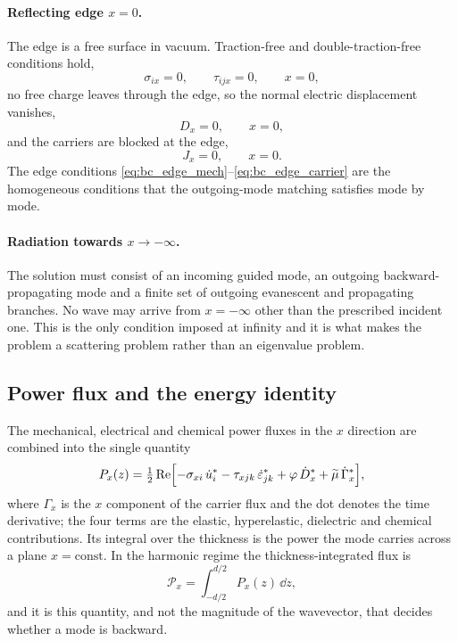 \paragraph{Reflecting edge $x=0$.}
The edge is a free surface in vacuum.  Traction-free and double-traction-free
conditions hold,
\begin{equation}
\label{eq:bc_edge_mech}
\sigma_{ix}=0,\qquad \tau_{ijx}=0,\qquad x=0,
\end{equation}
no free charge leaves through the edge, so the normal electric displacement
vanishes,
\begin{equation}
\label{eq:bc_edge_elec}
D_x=0,\qquad x=0,
\end{equation}
and the carriers are blocked at the edge,
\begin{equation}
\label{eq:bc_edge_carrier}
J_x=0,\qquad x=0 .
\end{equation}
The edge conditions \eqref{eq:bc_edge_mech}--\eqref{eq:bc_edge_carrier} are the
homogeneous conditions that the outgoing-mode matching satisfies mode by mode.

\paragraph{Radiation towards $x\to-\infty$.}
The solution must consist of an incoming guided mode, an outgoing
backward-propagating mode and a finite set of outgoing evanescent and
propagating branches.  No wave may arrive from $x=-\infty$ other than the
prescribed incident one.  This is the only condition imposed at infinity and it
is what makes the problem a scattering problem rather than an eigenvalue
problem.

\subsection{Power flux and the energy identity}
\label{sec:governing_energy}

The mechanical, electrical and chemical power fluxes in the $x$ direction are
combined into the single quantity
\begin{equation}
\label{eq:powerflux}
P_x(z)=\tfrac12\operatorname{Re}\Bigl[-\sigma_{xi}\,\dot u_i^{*}
-\tau_{xjk}\,\dot\varepsilon_{jk}^{*}
+\varphi\,\dot D_x^{*}
+\widetilde\mu\,\dot\Gamma_x^{*}\Bigr],
\end{equation}
where $\Gamma_x$ is the $x$ component of the carrier flux and the dot denotes
the time derivative; the four terms are the elastic, hyperelastic, dielectric
and chemical contributions.  Its integral over the thickness is the power the
mode carries across a plane $x=\text{const}$.  In the harmonic regime the
thickness-integrated flux is
\begin{equation}
\label{eq:Px_int}
\mathcal{P}_x=\int_{-d/2}^{d/2}P_x(z)\,\dd z ,
\end{equation}
and it is this quantity, and not the magnitude of the wavevector, that decides
whether a mode is backward.

